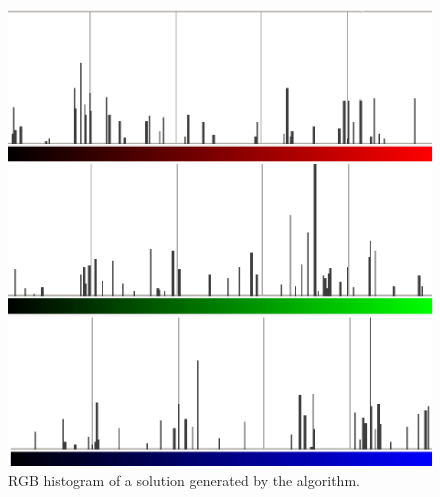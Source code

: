 \documentclass[conference]{IEEEtran}
\begin{document}
\begin{figure}
\centering
   \includegraphics[scale =0.6] {images/individuohist.eps}
\caption{RGB histogram of a solution generated by the algorithm.}
\label{fig:histoind}
\end{figure}
\end{document}
